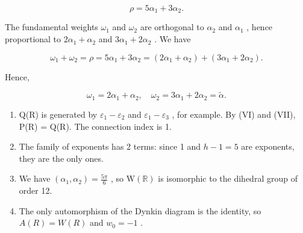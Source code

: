 \[
\rho = 5 \alpha_ {1} + 3 \alpha_ {2}.
\]

The fundamental weights \(\omega_{1}\) and \(\omega_{2}\) are orthogonal to \(\alpha_{2}\) and \(\alpha_{1}\) , hence proportional to \(2\alpha_{1} + \alpha_{2}\) and \(3\alpha_{1} + 2\alpha_{2}\) . We have

\[
\omega_ {1} + \omega_ {2} = \rho = 5 \alpha_ {1} + 3 \alpha_ {2} = (2 \alpha_ {1} + \alpha_ {2}) + (3 \alpha_ {1} + 2 \alpha_ {2}).
\]

Hence,

\[
\omega_ {1} = 2 \alpha_ {1} + \alpha_ {2}, \quad \omega_ {2} = 3 \alpha_ {1} + 2 \alpha_ {2} = \tilde {\alpha}.
\]

\begin{enumerate}
\def\labelenumi{(\Roman{enumi})}
\setcounter{enumi}{7}
\item
  Q(R) is generated by \(\varepsilon_{1}-\varepsilon_{2}\) and \(\varepsilon_{1}-\varepsilon_{3}\) , for example. By (VI) and (VII), P(R) = Q(R). The connection index is 1.
\item
  The family of exponents has 2 terms: since 1 and \(h - 1 = 5\) are exponents, they are the only ones.
\item
  We have \((\alpha_{1},\alpha_{2}) = \frac{5\pi}{6}\) , so \(\mathrm{W}(\mathbb{R})\) is isomorphic to the dihedral group of order 12.
\item
  The only automorphism of the Dynkin diagram is the identity, so \(A(R) = W(R)\) and \(w_{0} = -1\) .
\end{enumerate}

